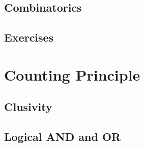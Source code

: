 \subsection{Combinatorics}
\subsection{Exercises}

\newpage
\section{Counting Principle}
\subsection{Clusivity}
\noindent{}
\subsection{Logical AND and OR}
